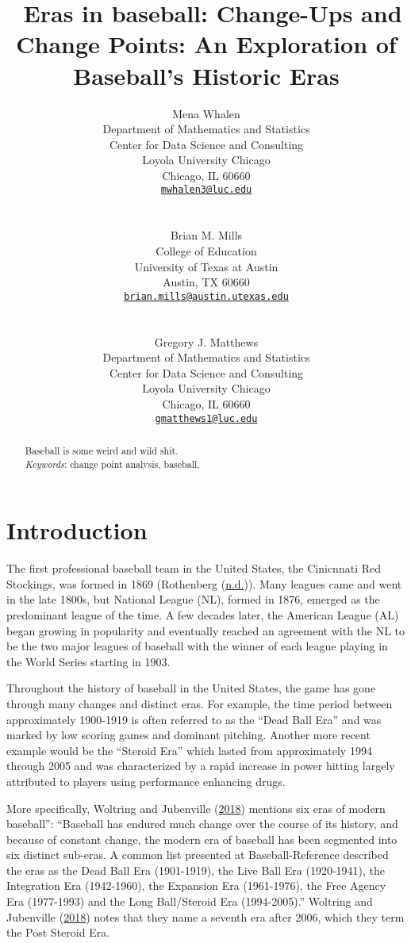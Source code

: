 \documentclass[
  12pt,
]{article}
\title{~\Large Eras in baseball: Change-Ups and Change Points: An
Exploration of Baseball's Historic Eras}
\author{\large Mena Whalen \vspace{-1.1mm}\\
\normalsize Department of Mathematics and Statistics \vspace{-1mm}\\
\normalsize Center for Data Science and Consulting \vspace{-1mm}\\
\normalsize Loyola University Chicago \vspace{-1mm}\\
\normalsize Chicago, IL 60660 \vspace{-1mm}\\
\normalsize \href{mailto:mwhalen3@luc.edu}{\texttt{mwhalen3@luc.edu}}
\vspace{-1mm}\\
\strut \\
\large Brian M. Mills \vspace{-1.1mm}\\
\normalsize College of Education \vspace{-1mm}\\
\normalsize University of Texas at Austin \vspace{-1mm}\\
\normalsize Austin, TX 60660 \vspace{-1mm}\\
\normalsize \href{mailto:brian.mills@austin.utexas.edu}{\texttt{brian.mills@austin.utexas.edu}}
\vspace{-1mm}\\
\strut \\
\large Gregory J. Matthews \vspace{-1.1mm}\\
\normalsize Department of Mathematics and Statistics \vspace{-1mm}\\
\normalsize Center for Data Science and Consulting \vspace{-1mm}\\
\normalsize Loyola University Chicago \vspace{-1mm}\\
\normalsize Chicago, IL 60660 \vspace{-1mm}\\
\normalsize \href{mailto:gmatthews1@luc.edu}{\texttt{gmatthews1@luc.edu}}
\vspace{-1mm}}
\date{}
\begin{document}
\maketitle
\begin{abstract}
Baseball is some weird and wild shit. \vspace{2mm}\\
\emph{Keywords}: change point analysis, baseball,
\end{abstract}

\newpage

\hypertarget{sec:intro}{%
\section{Introduction}\label{sec:intro}}

The first professional baseball team in the United States, the
Cinicnnati Red Stockings, was formed in 1869 (Rothenberg
(\protect\hyperlink{ref-BBHOF1869}{n.d.})). Many leagues came and went
in the late 1800s, but National League (NL), formed in 1876, emerged as
the predominant league of the time. A few decades later, the American
League (AL) began growing in popularity and eventually reached an
agreement with the NL to be the two major leagues of baseball with the
winner of each league playing in the World Series starting in 1903.

Throughout the history of baseball in the United States, the game has
gone through many changes and distinct eras. For example, the time
period between approximately 1900-1919 is often referred to as the
``Dead Ball Era'' and was marked by low scoring games and dominant
pitching. Another more recent example would be the ``Steroid Era'' which
lasted from approximately 1994 through 2005 and was characterized by a
rapid increase in power hitting largely attributed to players using
performance enhancing drugs.

More specifically, Woltring and Jubenville
(\protect\hyperlink{ref-Woltring2018}{2018}) mentions six eras of modern
baseball'': ``Baseball has endured much change over the course of its
history, and because of constant change, the modern era of baseball has
been segmented into six distinct sub-eras. A common list presented at
Baseball-Reference described the eras as the Dead Ball Era (1901-1919),
the Live Ball Era (1920-1941), the Integration Era (1942-1960), the
Expansion Era (1961-1976), the Free Agency Era (1977-1993) and the Long
Ball/Steroid Era (1994-2005).'' Woltring and Jubenville
(\protect\hyperlink{ref-Woltring2018}{2018}) notes that they name a
seventh era after 2006, which they term the Post Steroid Era.
\end{document}
